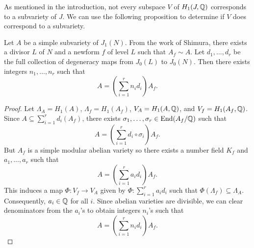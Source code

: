 \documentclass{article}
\begin{document}
As mentioned in the introduction, not every subspace $V$ of $H_1(J, \mathbb{Q})$
corresponds to a subvariety of $J$. We can use the following proposition to
determine if $V$ does correspond to a subvariety.

\begin{proposition}
    Let $A$ be a simple subvariety of $J_1(N)$. From the work of Shimura,
    there exists a divisor $L$ of $N$ and a newform $f$ of level $L$ such that
    $A_f \sim A$. Let $d_1,\ldots,d_r$ be the full collection of degeneracy
    maps from $J_0(L)$ to $J_0(N)$. Then there exists integers $n_1,\ldots,n_r$
    such that
    \[
        A = 
        \left(\sum_{i=1} ^r n_i d_i\right)
        A_f.
    \]
\end{proposition}
\begin{proof}
    Let $\Lambda_A = H_1(A)$, $\Lambda_f=H_1(A_f)$, $V_A=H_1(A, \mathbb{Q})$, and
    $V_f=H_1(A_f, \mathbb{Q})$. Since $A \subseteq \sum_{i=1} ^r d_i(A_f)$, there
    exists $\sigma_1,\ldots,\sigma_r\in \operatorname{End}(A_f/\mathbb{Q})$ such that 
    \[
        A = 
        \left(\sum_{i=1} ^r d_i \circ \sigma_i\right) A_f.
    \]
    But $A_f$ is a simple modular abelian variety so there exists a number
    field $K_f$ and $a_1,\ldots,a_r$ such that
    \[
        A = 
        \left(\sum_{i=1} ^r a_i d_i\right) A_f.
    \]
    This induces a map $\Phi:V_f\to V_A$ given by $\Phi:\sum_{i=1} ^r a_i d_i$
    such that $\Phi(\Lambda_f)\subseteq \Lambda_A$. Consequently, $a_i\in \mathbb{Q}$
    for all $i$. Since abelian varieties are divisible, we can clear
    denominators from the $a_i$'s to obtain integers $n_i$'s such that
    \[
        A = 
        \left(\sum_{i=1} ^r n_i d_i\right)
        A_f.
    \]
\end{proof}
\end{document}

